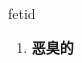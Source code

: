 
\begin{frame}
{\huge fetid}
\begin{center}
\begin{enumerate}\Large
  \item \textbf{恶臭的}
\end{enumerate}
\end{center}
\end{frame}
